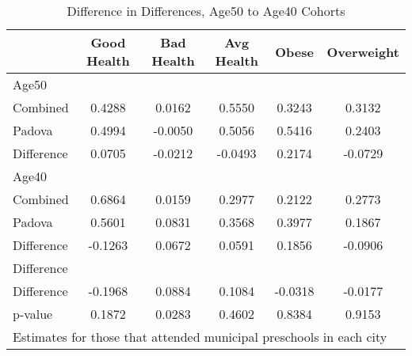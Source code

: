 \begin{table}[htbp]\centering
\caption{Difference in Differences, Age50 to Age40 Cohorts}
\begin{tabular}{l*{5}{c}}
\hline\hline
            & Good Health&  Bad Health&  Avg Health&       Obese&  Overweight\\
\hline
Age50       &            &            &            &            &            \\
Combined    &      0.4288&      0.0162&      0.5550&      0.3243&      0.3132\\
Padova      &      0.4994&     -0.0050&      0.5056&      0.5416&      0.2403\\
Difference  &      0.0705&     -0.0212&     -0.0493&      0.2174&     -0.0729\\
\hline
Age40       &            &            &            &            &            \\
Combined    &      0.6864&      0.0159&      0.2977&      0.2122&      0.2773\\
Padova      &      0.5601&      0.0831&      0.3568&      0.3977&      0.1867\\
Difference  &     -0.1263&      0.0672&      0.0591&      0.1856&     -0.0906\\
\hline
Difference  &            &            &            &            &            \\
Difference  &     -0.1968&      0.0884&      0.1084&     -0.0318&     -0.0177\\
p-value     &      0.1872&      0.0283&      0.4602&      0.8384&      0.9153\\
\hline\hline
\multicolumn{6}{l}{\footnotesize Estimates for those that attended municipal preschools in each city}\\
\end{tabular}
\end{table}
